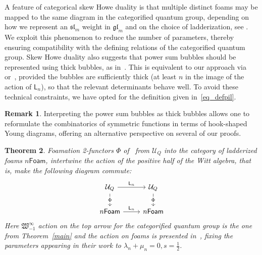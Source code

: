 \documentclass{amsart}
\numberwithin{equation}{section}
\newtheorem{thm}{Theorem}[section]
\theoremstyle{definition}
\newtheorem{remark}[thm]{Remark}
\newcommand{\Ucat}{\mathcal{U}_Q}
\newcommand{\witt}{{\mathfrak{W}}}
\newcommand{\LLn}[1][n]{{\mathsf{L}_{#1}}}
\newcommand{\ourwitt}{{\witt_{-1}^{\infty}}}
\begin{document}
A feature of categorical skew Howe duality is that multiple distinct foams may be mapped to the same diagram in the categorified quantum group, depending on how we represent an $\mathfrak{sl}_m$ weight in $\mathfrak{gl}_m$ and on the choice of ladderization, see \cite[Remark 2.3.3]{QR}. We exploit this phenomenon to reduce the number of parameters, thereby ensuring compatibility with the defining relations of the categorified quantum group. Skew Howe duality also suggests that power sum bubbles should be represented using thick bubbles, as in~\cite[Equation 3.56]{QR}. This is equivalent to our approach via~\cite[Equations 4.33 and 4.34]{Khovanov_2012} or~\cite[Equations 5.1 and 5.2]{MSV}, provided the bubbles are sufficiently thick (at least $n$ in the image of the action of $\LLn[n]$), so that the relevant determinants behave well. To avoid these technical constraints, we have opted for the definition given in~\eqref{eq_defpil}. 

\begin{remark}
    Interpreting the power sum bubbles as thick bubbles allows one to reformulate the combinatorics of symmetric functions in terms of hook-shaped Young diagrams, offering an alternative perspective on several of our proofs.
\end{remark}


 

\begin{thm}\label{equivarancefoam}
    Foamation 2-functors $\Phi$ of~\cite[Section 3.2]{QR} from $\Ucat$  into the category of ladderized foams $n\mathsf{Foam}$, intertwine the action of the positive half of the Witt algebra, that is, make the following diagram commute: 
\[
\begin{tikzcd}
\Ucat \arrow[r, "\LLn"] \arrow[d, "\Phi" description] & \Ucat \arrow[d, "\Phi" description] \\
n\mathsf{Foam} \arrow[r, "\LLn"]                                  & n\mathsf{Foam}                                
\end{tikzcd}
\]
Here $\ourwitt$ action on the top arrow for the categorified quantum group is the one from Theorem~\ref{main} and the action on foams is presented in~\cite{qi2024symmetriesmathfrakglnfoams}, fixing the parameters appearing in their work to $ \lambda_n + \mu_n = 0, s = \frac{1}{2} $.   
\end{thm}
\end{document}
